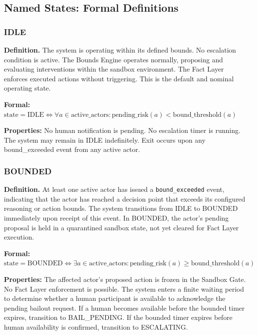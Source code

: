 \subsection{Named States: Formal Definitions}

\subsubsection{IDLE}

\textbf{Definition.} The system is operating within its defined bounds. No escalation condition is active. The Bounds Engine operates normally, proposing and evaluating interventions within the sandbox environment. The Fact Layer enforces executed actions without triggering. This is the default and nominal operating state.

\textbf{Formal:} $\text{state} = \text{IDLE} \Leftrightarrow \forall a \in \text{active\_actors}: \text{pending\_risk}(a) < \text{bound\_threshold}(a)$

\textbf{Properties:} No human notification is pending. No escalation timer is running. The system may remain in IDLE indefinitely. Exit occurs upon any bound\_exceeded event from any active actor.

\subsubsection{BOUNDED}

\textbf{Definition.} At least one active actor has issued a \texttt{bound\_exceeded} event, indicating that the actor has reached a decision point that exceeds its configured reasoning or action bounds. The system transitions from IDLE to BOUNDED immediately upon receipt of this event. In BOUNDED, the actor's pending proposal is held in a quarantined sandbox state, not yet cleared for Fact Layer execution.

\textbf{Formal:} $\text{state} = \text{BOUNDED} \Leftrightarrow \exists a \in \text{active\_actors}: \text{pending\_risk}(a) \geq \text{bound\_threshold}(a)$

\textbf{Properties:} The affected actor's proposed action is frozen in the Sandbox Gate. No Fact Layer enforcement is possible. The system enters a finite waiting period to determine whether a human participant is available to acknowledge the pending bailout request. If a human becomes available before the bounded timer expires, transition to BAIL\_PENDING. If the bounded timer expires before human availability is confirmed, transition to ESCALATING.

